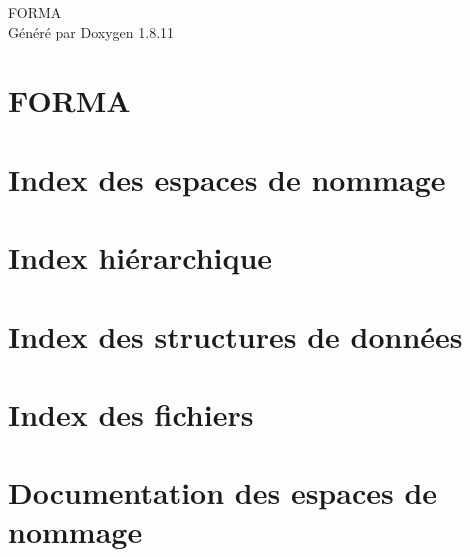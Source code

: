 \documentclass[twoside]{book}
\newcommand{\+}{\discretionary{\mbox{\scriptsize$\hookleftarrow$}}{}{}}
\newcommand{\clearemptydoublepage}{%
  \newpage{\pagestyle{empty}\cleardoublepage}%
}
\begin{document}
\hypersetup{pageanchor=false,
             bookmarksnumbered=true,
             pdfencoding=unicode
            }
\begin{titlepage}
\vspace*{7cm}
\begin{center}%
{\Large F\+O\+R\+MA }\\
\vspace*{1cm}
{\large Généré par Doxygen 1.8.11}\\
\end{center}
\end{titlepage}
\clearemptydoublepage
\tableofcontents
\clearemptydoublepage
{}
\hypersetup{pageanchor=true}

\chapter{F\+O\+R\+MA}
\label{md_README}
\hypertarget{md_README}{}

\chapter{Index des espaces de nommage}

\chapter{Index hiérarchique}

\chapter{Index des structures de données}

\chapter{Index des fichiers}

\chapter{Documentation des espaces de nommage}




\end{document}
